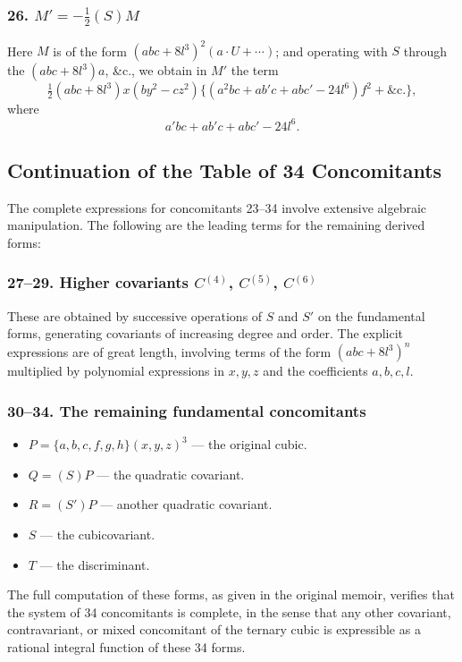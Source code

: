 \documentclass[11pt,a4paper]{book}
\begin{document}
\subsubsection*{26. $M' = -\frac{1}{2}(S)M$}

Here $M$ is of the form $(abc + 8l^3)^2(a\cdot U + \dotsb)$; and operating with $S$ through the $(abc + 8l^3)a$, \&c., we obtain in $M'$ the term
\[
\tfrac{1}{2}(abc + 8l^3)x(by^2 - cz^2)\{(a^2bc + ab'c + abc' - 24l^6)f^2 + \&\text{c.}\},
\]
where
\[
a'bc + ab'c + abc' - 24l^6.
\]

\subsection*{Continuation of the Table of 34 Concomitants}

The complete expressions for concomitants 23--34 involve extensive algebraic manipulation. The following are the leading terms for the remaining derived forms:

\subsubsection*{27--29. Higher covariants $C^{(4)}$, $C^{(5)}$, $C^{(6)}$}

These are obtained by successive operations of $S$ and $S'$ on the fundamental forms, generating covariants of increasing degree and order. The explicit expressions are of great length, involving terms of the form $(abc + 8l^3)^n$ multiplied by polynomial expressions in $x, y, z$ and the coefficients $a, b, c, l$.

\subsubsection*{30--34. The remaining fundamental concomitants}

\begin{itemize}
\item[30.] $P = \{a, b, c, f, g, h\}(x, y, z)^3$ --- the original cubic.
\item[31.] $Q = (S)P$ --- the quadratic covariant.
\item[32.] $R = (S')P$ --- another quadratic covariant.
\item[33.] $S$ --- the cubicovariant.
\item[34.] $T$ --- the discriminant.
\end{itemize}

The full computation of these forms, as given in the original memoir, verifies that the system of 34 concomitants is complete, in the sense that any other covariant, contravariant, or mixed concomitant of the ternary cubic is expressible as a rational integral function of these 34 forms.
\end{document}
